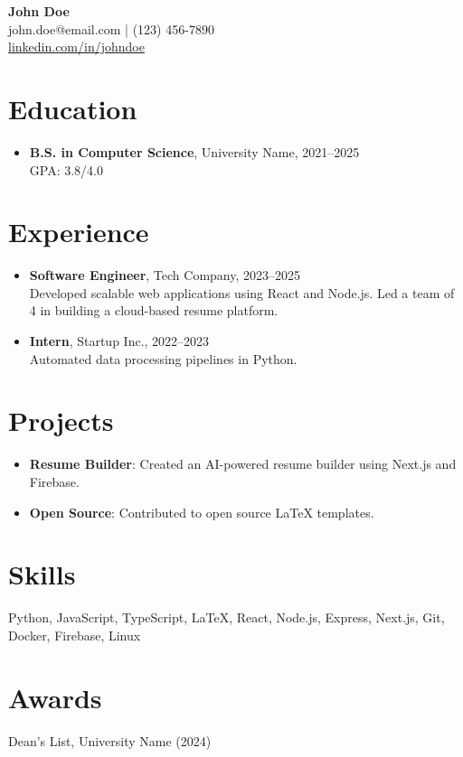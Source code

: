 \documentclass[11pt]{article}
\begin{document}
\begin{center}
    {\Huge \textbf{John Doe}} \\
    \vspace{2mm}
    john.doe@email.com \quad | \quad (123) 456-7890 \\
    \href{https://linkedin.com/in/johndoe}{linkedin.com/in/johndoe}
\end{center}

\vspace{4mm}

\section*{Education}
\begin{itemize}[leftmargin=*]
  \item \textbf{B.S. in Computer Science}, University Name, 2021--2025\\
  GPA: 3.8/4.0
\end{itemize}

\section*{Experience}
\begin{itemize}[leftmargin=*]
  \item \textbf{Software Engineer}, Tech Company, 2023--2025\\
  Developed scalable web applications using React and Node.js. Led a team of 4 in building a cloud-based resume platform.
  \item \textbf{Intern}, Startup Inc., 2022--2023\\
  Automated data processing pipelines in Python.
\end{itemize}

\section*{Projects}
\begin{itemize}[leftmargin=*]
  \item \textbf{Resume Builder}: Created an AI-powered resume builder using Next.js and Firebase.
  \item \textbf{Open Source}: Contributed to open source LaTeX templates.
\end{itemize}

\section*{Skills}
Python, JavaScript, TypeScript, LaTeX, React, Node.js, Express, Next.js, Git, Docker, Firebase, Linux

\section*{Awards}
Dean's List, University Name (2024)
\end{document}
